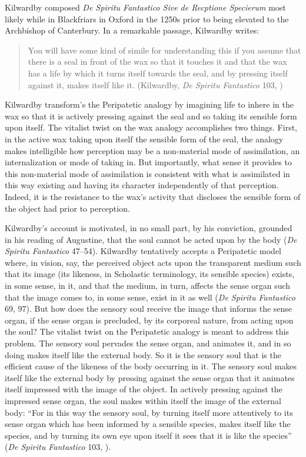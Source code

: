 Kilwardby composed \emph{De Spiritu Fantastico Sive de Recptione Specierum} most likely while in Blackfriars in Oxford in the 1250s prior to being elevated to the Archbishop of Canterbury. In a remarkable passage, Kilwardby writes:
\begin{quote}
	You will have some kind of simile for understanding this if you assume that there is a seal in front of the wax so that it touches it and that the wax has a life by which it turns itself towards the seal, and by pressing itself against it, makes itself like it. (Kilwardby, \emph{De Spiritu Fantastico} 103, \citealt[94]{Broadie:1993dz})
\end{quote}
Kilwardby transform's the Peripatetic analogy by imagining life to inhere in the wax so that it is actively pressing against the seal and so taking its sensible form upon itself. The vitalist twist on the wax analogy accomplishes two things. First, in the active wax taking upon itself the sensible form of the seal, the analogy makes intelligible how perception may be a non-material mode of assimilation, an internalization or mode of taking in. But importantly, what sense it provides to this non-material mode of assimilation is consistent with what is assimilated in this way existing and having its character independently of that perception. Indeed, it is the resistance to the wax's activity that discloses the sensible form of the object had prior to perception.

Kilwardby's account is motivated, in no small part, by his conviction, grounded in his reading of Augustine, that the soul cannot be acted upon by the body (\emph{De Spiritu Fantastico} 47--54). Kilwardby tentatively accepts a Peripatetic model where, in vision, say, the perceived object acts upon the transparent medium such that its image (its likeness, in Scholastic terminology, its sensible species) exists, in some sense, in it, and that the medium, in turn, affects the sense organ such that the image comes to, in some sense, exist in it as well (\emph{De Spiritu Fantastico} 69, 97). But how does the sensory soul receive the image that informs the sense organ, if the sense organ is precluded, by its corporeal nature, from acting upon the soul? The vitalist twist on the Peripatetic analogy is meant to address this problem. The sensory soul pervades the sense organ, and animates it, and in so doing makes itself like the external body. So it is the sensory soul that is the efficient cause of the likeness of the body occurring in it. The sensory soul makes itself like the external body by pressing against the sense organ that it animates itself impressed with the image of the object. In actively pressing against the impressed sense organ, the soul makes within itself the image of the external body: ``For in this way the sensory soul, by turning itself more attentively to its sense organ which has been informed by a sensible species, makes itself like the species, and by turning its own eye upon itself it sees that it is like the species'' (\emph{De Spiritu Fantastico} 103, \citealt[94]{Broadie:1993dz}).

